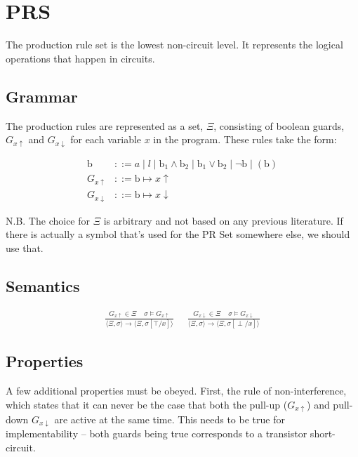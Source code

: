 \documentclass[times,10pt]{article}
\begin{document}
\section{PRS}

The production rule set is the lowest non-circuit level.  It represents the logical operations that happen in circuits. 

\subsection{Grammar}

The production rules are represented as a set, $\Xi$, consisting of boolean guards, $G_{x\uparrow}$ and $G_{x\downarrow}$ for each variable $x$ in the program.  These rules take the form:

\begin{align*}
\mathrm{b} & ::= a \; | \; \mathit{l} \; | \; \mathrm{b} _1 \wedge \mathrm{b}_2 \; | \; \mathrm{b}_1 \vee \mathrm{b}_2 \; | \; \lnot \mathrm{b} \; | \; ( \mathrm{b} ) \\
G_{x\uparrow} &::= \mathrm{b} \mapsto x\uparrow  \\
G_{x\downarrow} &::= \mathrm{b} \mapsto x\downarrow 
\end{align*}

N.B. The choice for $\Xi$ is arbitrary and not based on any previous literature.  If there is actually a symbol that's used for the PR Set somewhere else, we should use that.

\subsection{Semantics}

\begin{align*}
\frac{G_{x\uparrow} \in \Xi  \;\;\;\;  \sigma \models G_{x\uparrow} }{\langle \Xi, \sigma \rangle \rightarrow  \langle \Xi , \sigma[\top/x]\rangle} &\;\; 
\frac{G_{x\downarrow} \in \Xi  \;\;\;\;  \sigma \models G_{x\downarrow} }{\langle \Xi, \sigma \rangle \rightarrow \langle \Xi , \sigma[\perp/x]\rangle}
\end{align*}

\subsection{Properties}

A few additional properties must be obeyed.  First, the rule of non-interference, which states that it can never be the case that both the pull-up ($G_{x\uparrow}$) and pull-down $G_{x\downarrow}$ are active at the same time.  This needs to be true for implementability -- both guards being true corresponds to a transistor short-circuit.
\end{document}
